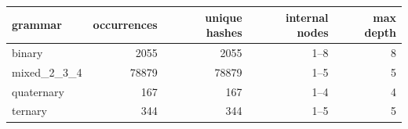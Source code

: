 \begin{tabular}{@{}lrrrr@{}}
\toprule
grammar & occurrences & unique hashes & internal nodes & max depth \\
\midrule
binary & 2055 & 2055 & 1--8 & 8 \\
mixed\allowbreak\_2\allowbreak\_3\allowbreak\_4 & 78879 & 78879 & 1--5 & 5 \\
quaternary & 167 & 167 & 1--4 & 4 \\
ternary & 344 & 344 & 1--5 & 5 \\
\bottomrule
\end{tabular}
